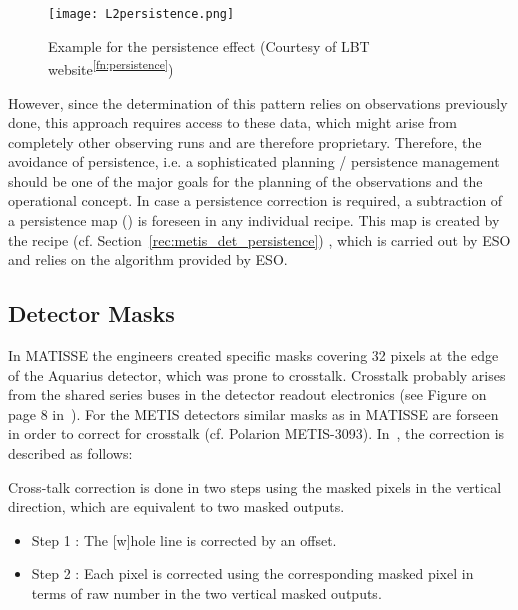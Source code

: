 \begin{figure}[ht]
  \centering
  \texttt{[image: L2persistence.png]}
  \caption[Persistence example]{Example for the persistence effect (Courtesy
    of LBT website\textsuperscript{\ref{fn:persistence}})}
  \label{fig:h2rg_persistence}
\end{figure}

However, since the determination of this pattern relies on observations previously done, this approach requires access to these data, which might arise from completely other observing runs and are therefore proprietary.
Therefore, the avoidance of persistence, i.e. a sophisticated planning / persistence management should be one of the major goals for the planning of the observations and the operational concept.
In case a persistence correction is required, a subtraction of a persistence map (\hyperref[dataitem:persistence_map]{}) is foreseen in any individual recipe. This map is created by the recipe \hyperref[rec:metis_det_persistence]{} (cf. Section~\ref{rec:metis_det_persistence}) , which is carried out by \ac{ESO} and relies on the algorithm provided by \ac{ESO}.



\subsection{Detector Masks}\label{ssec:criticaldetetctormasks}

In MATISSE the engineers created specific masks covering 32 pixels at the edge of the Aquarius detector, which was prone to crosstalk.
Crosstalk probably arises from the shared series buses in the detector readout electronics (see Figure on page 8 in~\cite{matisse_minutes}).
For the METIS detectors similar masks as in MATISSE are forseen in order to correct for crosstalk (cf. Polarion METIS-3093).
In~\cite{matisse_minutes}, the correction is described as follows:

\begin{displayquote}
    Cross-talk correction is done in two steps using the masked pixels in the vertical direction, which are equivalent to two masked outputs.
    \begin{itemize}
        \item Step 1 : The [w]hole line is corrected by an offset.
        \item Step 2 : Each pixel is corrected using the corresponding masked pixel in terms of raw
            number in the two vertical masked outputs.
    \end{itemize}
\end{displayquote}

